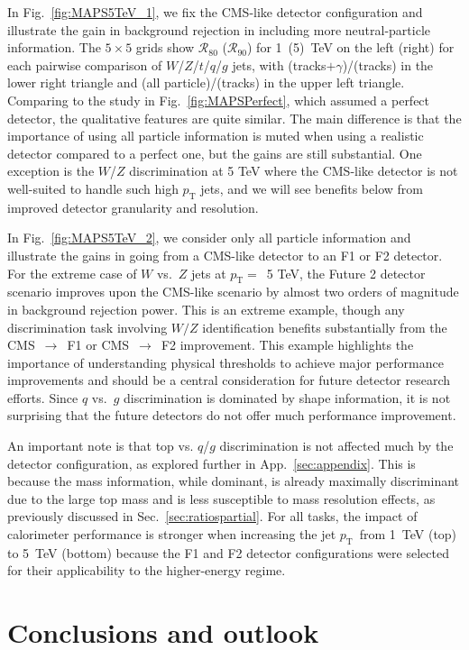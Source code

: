 \documentclass[11pt,letterpaper]{article}
\DeclareRobustCommand{\Sec}[1]{Sec.~\ref{#1}}
\DeclareRobustCommand{\App}[1]{App.~\ref{#1}}
\DeclareRobustCommand{\Fig}[1]{Fig.~\ref{#1}}
\newcommand{\pt}{p_{\mathrm{T}}}
\begin{document}
In \Fig{fig:MAPS5TeV_1}, we fix the CMS-like detector configuration and illustrate the gain in background rejection in including more neutral-particle information.
%
The $5 \times 5$ grids show $\mathcal{R}_{80}$ ($\mathcal{R}_{90}$) for 1~(5)~TeV on the left (right) for each pairwise comparison of $W$/$Z$/$t$/$q$/$g$ jets, with (tracks$+\gamma$)/(tracks) in the lower right triangle and (all particle)/(tracks) in the upper left triangle.
%
Comparing to the study in \Fig{fig:MAPSPerfect}, which assumed a perfect detector, the qualitative features are quite similar.
%
The main difference is that the importance of using all particle information is muted when using a realistic detector compared to a perfect one, but the gains are still substantial.
%
One exception is the $W$/$Z$ discrimination at 5 TeV where the CMS-like detector is not well-suited to handle such high $\pt$ jets, and we will see benefits below from improved detector granularity and resolution.

In \Fig{fig:MAPS5TeV_2}, we consider only all particle information and illustrate the gains in going from a CMS-like detector to an F1 or F2 detector.
%
For the extreme case of $W$ vs.~$Z$ jets at $\pt =$~5 TeV,  the Future 2 detector scenario improves upon the CMS-like scenario by almost two orders of magnitude in background rejection power. 
%
This is an extreme example, though any discrimination task involving $W/Z$ identification benefits substantially from the CMS~$\to$~F1 or CMS~$\to$~F2 improvement.
%
This example highlights the importance of understanding physical thresholds to achieve major performance improvements and should be a central consideration for future detector research efforts. 
%
Since $q$ vs.~$g$ discrimination is dominated by shape information, it is not surprising that the future detectors do not offer much performance improvement.

An important note is that top vs. $q$/$g$ discrimination is not affected much by the detector configuration, as explored further in \App{sec:appendix}.
% 
This is because the mass information, while dominant, is already maximally discriminant due to the large top mass and is less susceptible to mass resolution effects, as previously discussed in \Sec{sec:ratiospartial}.
%
For all tasks, the impact of calorimeter performance is stronger when increasing the jet $\pt$~from 1~TeV (top) to 5~TeV (bottom) because the F1 and F2 detector configurations were selected for their applicability to the higher-energy regime.


\section{Conclusions and outlook}
\label{sec:conclusions}
\end{document}
